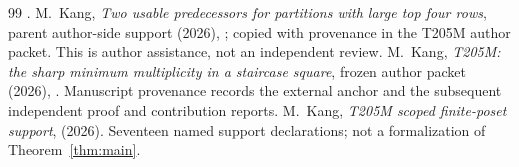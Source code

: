 \documentclass[11pt]{article}
\theoremstyle{remark}\newtheorem{remark}[theorem]{Remark}
\numberwithin{equation}{section}\setlength{\emergencystretch}{2em}
\begin{document}
\begin{thebibliography}{99}
.
 M.~Kang, \emph{Two usable predecessors for partitions
with large top four rows}, parent author-side support (2026),
; copied with provenance in the
T205M author packet. This is author assistance, not an independent review.
 M.~Kang, \emph{T205M: the sharp minimum multiplicity
in a staircase square}, frozen author packet (2026),
. Manuscript provenance records the
external anchor and the subsequent independent proof and contribution reports.
 M.~Kang, \emph{T205M scoped finite-poset support},
 (2026). Seventeen named support declarations;
not a formalization of Theorem~\ref{thm:main}.
\end{thebibliography}
\end{document}
